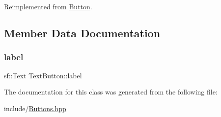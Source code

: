 Reimplemented from \mbox{\hyperlink{class_button_a95a9aafc24ed5d95d3557f7155832433}{Button}}.



\subsection{Member Data Documentation}
\mbox{\label{class_text_button_af83f98d5e8997c8ddd7f47088ad6159b}} 
\subsubsection{\texorpdfstring{label}{label}}
{\footnotesize\ttfamily sf\+::\+Text Text\+Button\+::label\hspace{0.3cm}{\ttfamily [private]}}



The documentation for this class was generated from the following file\+:\begin{DoxyCompactItemize}
\item 
include/\mbox{\hyperlink{_buttons_8hpp}{Buttons.\+hpp}}\end{DoxyCompactItemize}
